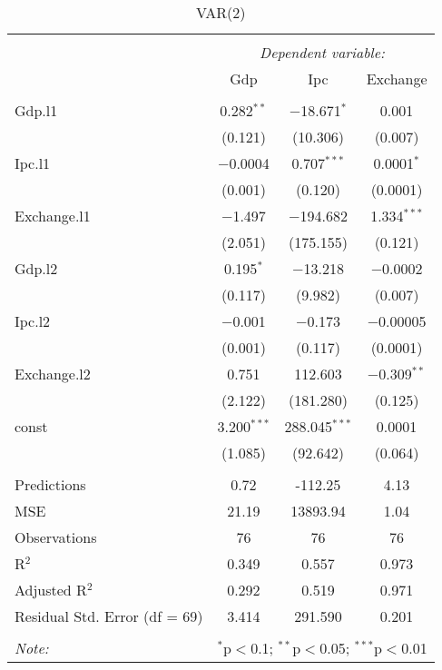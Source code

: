 
\begin{table}[H] \centering 
  \caption{VAR(2)} 
  \label{tb:var_2} 
\begin{tabular}{@{\extracolsep{5pt}}lccc} 
\\[-1.8ex]\hline 
\hline \\[-1.8ex] 
 & \multicolumn{3}{c}{\textit{Dependent variable:}} \\ 
\cline{2-4} 
 & Gdp & Ipc & Exchange \\ 
\hline \\[-1.8ex] 
 Gdp.l1 & 0.282$^{**}$ & $-$18.671$^{*}$ & 0.001 \\ 
  & (0.121) & (10.306) & (0.007) \\ 
  Ipc.l1 & $-$0.0004 & 0.707$^{***}$ & 0.0001$^{*}$ \\ 
  & (0.001) & (0.120) & (0.0001) \\ 
  Exchange.l1 & $-$1.497 & $-$194.682 & 1.334$^{***}$ \\ 
  & (2.051) & (175.155) & (0.121) \\ 
  Gdp.l2 & 0.195$^{*}$ & $-$13.218 & $-$0.0002 \\ 
  & (0.117) & (9.982) & (0.007) \\ 
  Ipc.l2 & $-$0.001 & $-$0.173 & $-$0.00005 \\ 
  & (0.001) & (0.117) & (0.0001) \\ 
  Exchange.l2 & 0.751 & 112.603 & $-$0.309$^{**}$ \\ 
  & (2.122) & (181.280) & (0.125) \\ 
  const & 3.200$^{***}$ & 288.045$^{***}$ & 0.0001 \\ 
  & (1.085) & (92.642) & (0.064) \\ 
 \hline \\[-1.8ex] 
Predictions & 0.72 & -112.25 & 4.13 \\ 
MSE & 21.19 & 13893.94 & 1.04 \\ 
Observations & 76 & 76 & 76 \\ 
R$^{2}$ & 0.349 & 0.557 & 0.973 \\ 
Adjusted R$^{2}$ & 0.292 & 0.519 & 0.971 \\ 
Residual Std. Error (df = 69) & 3.414 & 291.590 & 0.201 \\ 
\hline 
\hline \\[-1.8ex] 
\textit{Note:}  & \multicolumn{3}{r}{$^{*}$p$<$0.1; $^{**}$p$<$0.05; $^{***}$p$<$0.01} \\ 
\end{tabular} 
\end{table} 
